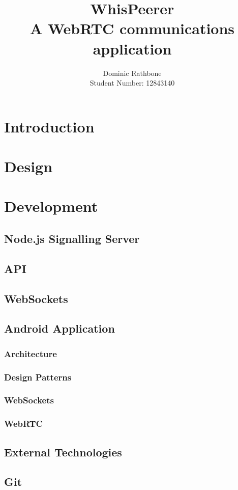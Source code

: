 \documentclass[]{report}
\title{WhisPeerer \\A WebRTC communications application}
\author{Dominic Rathbone \\ Student Number: 12843140}
\begin{document}
\maketitle
\tableofcontents

\chapter{Introduction}
\chapter{Design}
\chapter{Development}
	\section{Node.js Signalling Server}
		\section{API}
		\section{WebSockets}
	\section{Android Application}
		\subsection{Architecture}
		\subsection{Design Patterns}
		\subsection{WebSockets}
		\subsection{WebRTC}
	\section{External Technologies}
		\section{Git}
\end{document}
